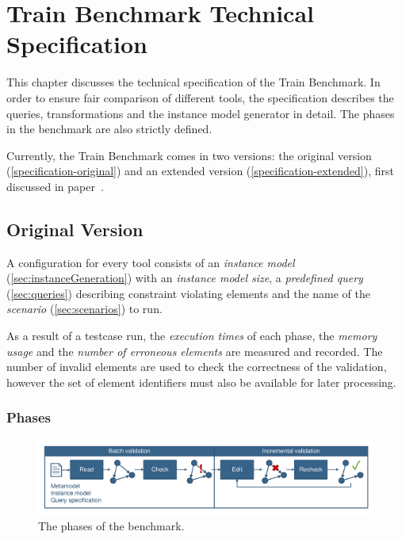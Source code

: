 \chapter{Train Benchmark Technical Specification}

This chapter discusses the technical specification of the Train Benchmark. In order to ensure fair comparison of different tools, the specification describes the queries, transformations and the instance model generator in detail. The phases in the benchmark are also strictly defined.

Currently, the Train Benchmark comes in two versions: the original version (\autoref{specification-original}) and an extended version (\autoref{specification-extended}), first discussed in paper~\cite{TB:ASE2013}.
 
\section{Original Version}
\label{specification-original}

A  configuration for every tool consists of an \emph{instance model} (\autoref{sec:instanceGeneration}) with an \emph{instance model size}, a \emph{predefined query} (\autoref{sec:queries}) describing constraint violating elements and the name of the \emph{scenario} (\autoref{sec:scenarios}) to run.

As a result of a testcase run, the \emph{execution times} of each phase, the \emph{memory usage} and the \emph{number of erroneous elements} are measured and recorded. The number of invalid elements are used to check the correctness of the validation, however the set of element identifiers must also be available for later processing. 


\subsection{Phases}
\label{sec:phases}

\begin{figure}[htb]
	\centering
	\includegraphics[width=\textwidth]{figures/trainbenchmark-sequence}
	\caption{The phases of the benchmark.}
	\label{fig:phases}
\end{figure}

